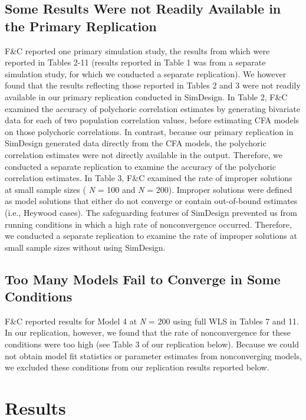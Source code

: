 \documentclass[10,a4paperpaper,]{article}
\begin{document}
\subsection{Some Results Were not Readily Available in the Primary Replication}

F\&C reported one primary simulation study, the results from which were
reported in Tables 2-11 (results reported in Table 1 was from a separate
simulation study, for which we conducted a separate replication). We
however found that the results reflecting those reported in Tables 2 and
3 were not readily available in our primary replication conducted in
SimDesign. In Table 2, F\&C examined the accuracy of polychoric
correlation estimates by generating bivariate data for each of two
population correlation values, before estimating CFA models on those
polychoric correlations. In contrast, because our primary replication in
SimDesign generated data directly from the CFA models, the polychoric
correlation estimates were not directly available in the output.
Therefore, we conducted a separate replication to examine the accuracy
of the polychoric correlation estimates. In Table 3, F\&C examined the
rate of improper solutions at small sample sizes ( \emph{N} = 100 and
\emph{N} = 200). Improper solutions were defined as model solutions that
either do not converge or contain out-of-bound estimates (i.e., Heywood
cases). The safeguarding features of SimDesign prevented us from running
conditions in which a high rate of nonconvergence occurred. Therefore,
we conducted a separate replication to examine the rate of improper
solutions at small sample sizes without using SimDesign.

\subsection{Too Many Models Fail to Converge in Some Conditions}

F\&C reported results for Model 4 at \emph{N} = 200 using full WLS in
Tables 7 and 11. In our replication, however, we found that the rate of
nonconvergence for these conditions were too high (see Table 3 of our
replication below). Because we could not obtain model fit statistics or
parameter estimates from nonconverging models, we excluded these
conditions from our replication results reported below. \clearpage

\FloatBarrier
\section{Results}
\end{document}
